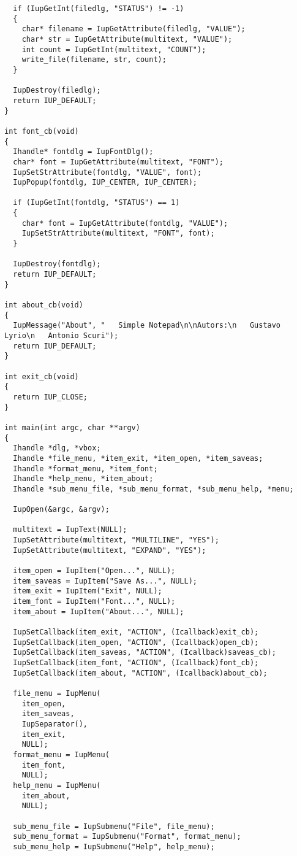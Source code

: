 \documentclass{ctexart}
\begin{document}
\begin{lstlisting}
  if (IupGetInt(filedlg, "STATUS") != -1)
  {
    char* filename = IupGetAttribute(filedlg, "VALUE");
    char* str = IupGetAttribute(multitext, "VALUE");
    int count = IupGetInt(multitext, "COUNT");
    write_file(filename, str, count);
  }

  IupDestroy(filedlg);
  return IUP_DEFAULT;
}

int font_cb(void)
{
  Ihandle* fontdlg = IupFontDlg();
  char* font = IupGetAttribute(multitext, "FONT");
  IupSetStrAttribute(fontdlg, "VALUE", font);
  IupPopup(fontdlg, IUP_CENTER, IUP_CENTER);

  if (IupGetInt(fontdlg, "STATUS") == 1)
  {
    char* font = IupGetAttribute(fontdlg, "VALUE");
    IupSetStrAttribute(multitext, "FONT", font);
  }

  IupDestroy(fontdlg);
  return IUP_DEFAULT;
}

int about_cb(void) 
{
  IupMessage("About", "   Simple Notepad\n\nAutors:\n   Gustavo Lyrio\n   Antonio Scuri");
  return IUP_DEFAULT;
}

int exit_cb(void)
{
  return IUP_CLOSE;
}

int main(int argc, char **argv)
{
  Ihandle *dlg, *vbox;
  Ihandle *file_menu, *item_exit, *item_open, *item_saveas;
  Ihandle *format_menu, *item_font;
  Ihandle *help_menu, *item_about;
  Ihandle *sub_menu_file, *sub_menu_format, *sub_menu_help, *menu;

  IupOpen(&argc, &argv);

  multitext = IupText(NULL);
  IupSetAttribute(multitext, "MULTILINE", "YES");
  IupSetAttribute(multitext, "EXPAND", "YES");

  item_open = IupItem("Open...", NULL);
  item_saveas = IupItem("Save As...", NULL);
  item_exit = IupItem("Exit", NULL);
  item_font = IupItem("Font...", NULL);
  item_about = IupItem("About...", NULL);

  IupSetCallback(item_exit, "ACTION", (Icallback)exit_cb);
  IupSetCallback(item_open, "ACTION", (Icallback)open_cb);
  IupSetCallback(item_saveas, "ACTION", (Icallback)saveas_cb);
  IupSetCallback(item_font, "ACTION", (Icallback)font_cb);
  IupSetCallback(item_about, "ACTION", (Icallback)about_cb);

  file_menu = IupMenu(
    item_open,
    item_saveas,
    IupSeparator(),
    item_exit,
    NULL);
  format_menu = IupMenu(
    item_font,
    NULL);
  help_menu = IupMenu(
    item_about,
    NULL);

  sub_menu_file = IupSubmenu("File", file_menu);
  sub_menu_format = IupSubmenu("Format", format_menu);
  sub_menu_help = IupSubmenu("Help", help_menu);


\end{lstlisting}
\end{document}
